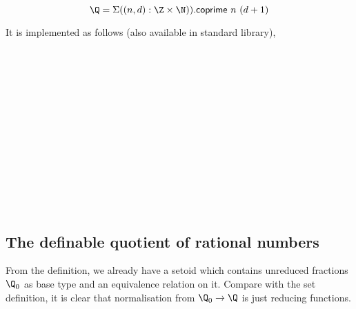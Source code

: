 $$\Q = \Sigma ((n , d) : \Z \times \N)). \mathsf{coprime} ~n ~(d +1)$$

It is implemented as follows (also available in standard library),

\begin{code}
\\
\>  \AgdaSymbol{:}  \<%
\\
\>[0]\<[2]%
\>[2]\<%
\\
\>[2]\<[4]%
\>[4] \<[18]%
\>[18]\AgdaSymbol{:} \<%
\\
\>[2]\<[4]%
\>[4] \AgdaSymbol{:} \<%
\\
\>[2]\<[4]%
\>[4] \<[18]%
\>[18]\AgdaSymbol{:}  \AgdaSymbol{(}    \AgdaSymbol{(} \AgdaSymbol{))}\<%
\\
%
\\
\>[0]\<[2]%
\>[2] \AgdaSymbol{:} \<%
\\
\>[0]\<[2]%
\>[2] \AgdaSymbol{=} \AgdaInductiveConstructor{+}  \<%
\\
%
\\
\>[0]\<[2]%
\>[2] \AgdaSymbol{:}   \<%
\\
\>[0]\<[2]%
\>[2] \AgdaSymbol{=}  \<%
\\
\end{code}

\subsection{The definable quotient of rational numbers}

From the definition, we already have a setoid which contains unreduced
fractions $\Q_0$ as
base type and an equivalence relation on it. Compare with the set
definition, it is clear that normalisation from $\Q_0 \to \Q$ is just
reducing functions.

